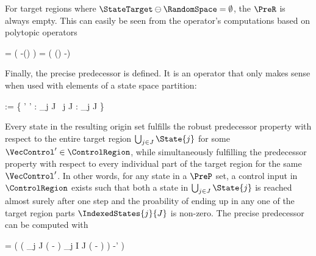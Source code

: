     For target regions where $\StateTarget \ominus \RandomSpace = \emptyset$, the $\PreR$ is always empty.
    This can easily be seen from the operator's computations based on polytopic operators

    \startformula
        \startalign[n=2,align={right,left}]
            \NC {} =
            \NC \StateRegion \cap \Big( \StateTarget \oplus -(\MatB \ControlRegion \oplus \RandomSpace) \Big) \MatA \EndAnd
            \NR
            \NC {} =
            \NC \StateRegion \cap \Big( (\StateTarget \ominus \RandomSpace) \oplus -\MatB \ControlRegion \Big) \MatA \EndPeriod
            \NR
        \stopalign
    \stopformula

    Finally, the precise predecessor is defined.
    It is an operator that only makes sense when used with elements of a state space partition:

    \startformula
        \startalign[n=2,align={right,left}]
            \NC {} := \Big\{ \VecState \in \StateRegion \Bigmid \exists \VecControl' \in \ControlSpace' :
            \NC {} \subseteq \bigcup_{j \in J}  \;
            \NR
            \NC \empty
            \NC ~\forall j \in J :  \cap \bigcup_{j \in J}  \neq \emptyset \Big\} \EndPeriod
            \NR
        \stopalign
    \stopformula

    Every state in the resulting origin set fulfills the robust predecessor property with respect to the entire target region $\bigcup_{j \in J} \State{j}$ for some $\VecControl' \in \ControlRegion$, while simultaneously fulfilling the predecessor property with respect to every individual part of the target region for the same $\VecControl'$.
    In other words, for any state in a $\PreP$ set, a control input in $\ControlRegion$ exists such that both a state in $\bigcup_{j \in J} \State{j}$ is reached almost surely after one step and the proability of ending up in any one of the target region parts $\IndexedStates{j}{J}$ is non-zero.
    The precise predecessor can be computed with

    \startformula
         =
        \Big( \Big( \bigcap_{j \in J} ( \oplus - \RandomSpace) \setminus \bigcup_{j \in I \setminus J} (  \oplus - \RandomSpace ) \Big) \oplus -\MatB \ControlSpace' \Big) \MatA \EndPeriod
    \stopformula

